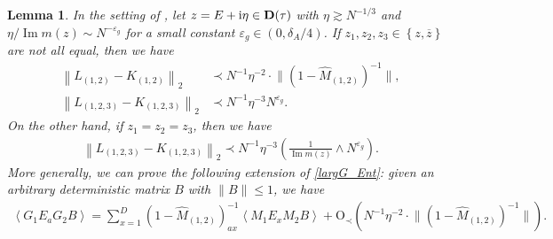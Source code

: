 \documentclass[10pt,reqno]{amsart}
\numberwithin{equation}{section}
\numberwithin{figure}{section}
\theoremstyle{plain} %
\newtheorem{lemma}[theorem]{Lemma}
\theoremstyle{definition} %
\newcommand{\wh}{\widehat}
\newcommand{\ii}{\mathrm{i}}
\renewcommand{\bar}{\overline}
\newcommand{\pa}[1]{\left({#1}\right)}
\newcommand{\ha}[1]{\left\{{#1}\right\}}
\newcommand{\avga}[1]{\left\langle #1 \right\rangle}
\DeclareMathOperator{\im}{\mathrm{Im}}
\newcommand{\e}{{\varepsilon}}
\newcommand{\opr}[1]{\mathrm{O}_\prec\left({#1}\right)}
\numberwithin{equation}{section}
\begin{document}
\begin{lemma}\label{lemma_G_large}
    In the setting of , let $z=E+\ii \eta \in \bf D(\tau)$ with $\eta\gtrsim N^{-1/3}$ and $\eta/\im m (z) \sim N^{-\varepsilon_g}$ for a small constant $\e_g\in\pa{0,\delta_A/4}$. %
    If $z_1,z_2,z_3\in\ha{z,\bar{z}}$ are not all equal, then we have
    \begin{align}\label{largG_Ent}
            \left\|L_{(1,2)}-K_{(1,2)}\right\|_2 &\prec N^{-1} \eta^{-2} \cdot\Big\|\left(1-\widehat{M}_{\pa{1,2}}\right)^{-1}\Big\|,\\
            \left\|L_{(1,2,3)}-K_{(1,2,3)}\right\|_2 &\prec N^{-1}\eta^{-3}N^{\varepsilon_g}.\label{largG_3G_1}
    \end{align}
    On the other hand, if $z_1=z_2=z_3$, then we have %
    \begin{equation}\label{largG_3G_2}
        \begin{aligned}
            \left\|L_{(1,2,3)}-K_{(1,2,3)}\right\|_2 \prec N^{-1}\eta^{-3}\pa{\frac{1}{\im m (z) }\wedge N^{\varepsilon_g}}.
        \end{aligned}
    \end{equation}
More generally, we can prove the following extension of \eqref{largG_Ent}: given an arbitrary deterministic matrix $B$ with $\|B\|\le 1$, we have 
    \begin{equation}\label{largG_Ent_BB}
        \begin{aligned}
            \avga{G_1E_aG_2B}=\sum_{x=1}^D\pa{1-\wh M_{\pa{1,2}}}^{-1}_{ax}\avga{M_1E_xM_2B}+\opr{N^{-1}\eta^{-2}\cdot\Big\|\pa{1-\wh M_{\pa{1,2}}}^{-1}\Big\|}.
        \end{aligned}
    \end{equation}
\end{lemma}
\end{document}
